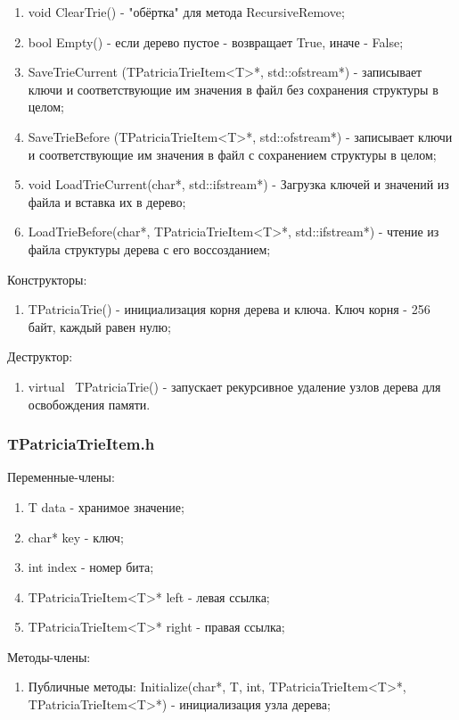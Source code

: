 \documentclass[12pt]{article}
\begin{document}
\begin{enumerate}
\begin{enumerate}
		\item void ClearTrie() - "обёртка" для метода RecursiveRemove;
		\item bool Empty() - если дерево пустое - возвращает True, иначе - False;
		\item SaveTrieCurrent (TPatriciaTrieItem<T>*, std::ofstream*) - записывает ключи и соответствующие им значения в файл без сохранения структуры в целом;
		\item SaveTrieBefore (TPatriciaTrieItem<T>*, std::ofstream*) - записывает ключи и соответствующие им значения в файл с сохранением структуры в целом;
		\item void LoadTrieCurrent(char*, std::ifstream*) - Загрузка ключей и значений из файла и вставка их в дерево;
		\item LoadTrieBefore(char*, TPatriciaTrieItem<T>*, std::ifstream*) - чтение из файла структуры дерева с его воссозданием;
	\end{enumerate}
\end{enumerate}


Конструкторы:
\begin{enumerate}
	\item TPatriciaTrie() - инициализация корня дерева и ключа. Ключ корня - 256 байт, каждый равен нулю;
\end{enumerate}

Деструктор:
\begin{enumerate}
	\item virtual ~TPatriciaTrie() - запускает рекурсивное удаление узлов дерева для освобождения памяти.
\end{enumerate}

\subsubsection*{TPatriciaTrieItem.h}

Переменные-члены:
\begin{enumerate}
	\item T data - хранимое значение;
	\item char* key - ключ;
	\item int index - номер бита;
	\item TPatriciaTrieItem<T>* left - левая ссылка;
	\item TPatriciaTrieItem<T>* right - правая ссылка;
\end{enumerate}

Методы-члены:
\begin{enumerate}
	\item Публичные методы:
		\subitem Initialize(char*, T, int, TPatriciaTrieItem<T>*, TPatriciaTrieItem<T>*) - инициализация узла дерева;
\end{enumerate}
\end{document}
